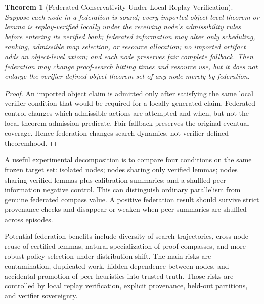 \documentclass[11pt]{article}
\newtheorem{theorem}{Theorem}[section]
\begin{document}
\begin{theorem}[Federated Conservativity Under Local Replay Verification]
Suppose each node in a federation is sound; every imported object-level theorem or lemma is replay-verified locally under the receiving node's admissibility rules before entering its verified bank; federated information may alter only scheduling, ranking, admissible map selection, or resource allocation; no imported artifact adds an object-level axiom; and each node preserves fair complete fallback. Then federation may change proof-search hitting times and resource use, but it does not enlarge the verifier-defined object theorem set of any node merely by federation.
\end{theorem}
\begin{proof}
An imported object claim is admitted only after satisfying the same local verifier condition that would be required for a locally generated claim. Federated control changes which admissible actions are attempted and when, but not the local theorem-admission predicate. Fair fallback preserves the original eventual coverage. Hence federation changes search dynamics, not verifier-defined theoremhood.
\end{proof}

A useful experimental decomposition is to compare four conditions on the same frozen target set: isolated nodes; nodes sharing only verified lemmas; nodes sharing verified lemmas plus calibration summaries; and a shuffled-peer-information negative control. This can distinguish ordinary parallelism from genuine federated compass value. A positive federation result should survive strict provenance checks and disappear or weaken when peer summaries are shuffled across episodes.

Potential federation benefits include diversity of search trajectories, cross-node reuse of certified lemmas, natural specialization of proof compasses, and more robust policy selection under distribution shift. The main risks are contamination, duplicated work, hidden dependence between nodes, and accidental promotion of peer heuristics into trusted truth. Those risks are controlled by local replay verification, explicit provenance, held-out partitions, and verifier sovereignty.
\end{document}
